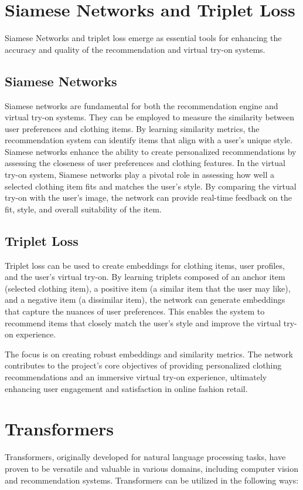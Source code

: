 \section{Siamese Networks and Triplet Loss}
	Siamese Networks and triplet loss emerge as essential tools for enhancing the accuracy and quality of the recommendation and virtual try-on systems.

	\subsection*{Siamese Networks}
		Siamese networks are fundamental for both the recommendation engine and virtual try-on systems. They can be employed to measure the similarity between user preferences and clothing items. By learning similarity metrics, the recommendation system can identify items that align with a user's unique style. Siamese networks enhance the ability to create personalized recommendations by assessing the closeness of user preferences and clothing features. In the virtual try-on system, Siamese networks play a pivotal role in assessing how well a selected clothing item fits and matches the user's style. By comparing the virtual try-on with the user's image, the network can provide real-time feedback on the fit, style, and overall suitability of the item.

	\subsection*{Triplet Loss}
		Triplet loss can be used to create embeddings for clothing items, user profiles, and the user's virtual try-on. By learning triplets composed of an anchor item (selected clothing item), a positive item (a similar item that the user may like), and a negative item (a dissimilar item), the network can generate embeddings that capture the nuances of user preferences. This enables the system to recommend items that closely match the user's style and improve the virtual try-on experience.

	The focus is on creating robust embeddings and similarity metrics. The network contributes to the project's core objectives of providing personalized clothing recommendations and an immersive virtual try-on experience, ultimately enhancing user engagement and satisfaction in online fashion retail.

\section{Transformers}
	Transformers, originally developed for natural language processing tasks, have proven to be versatile and valuable in various domains, including computer vision and recommendation systems. Transformers can be utilized in the following ways:

